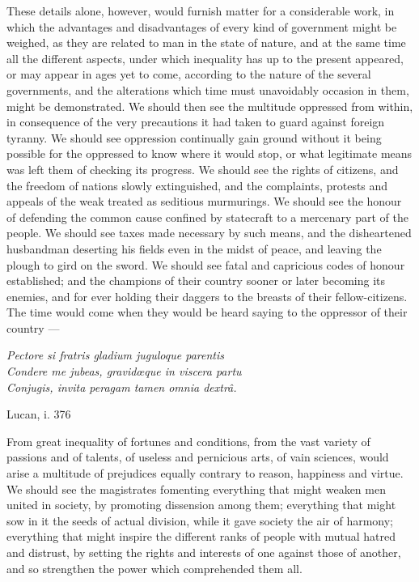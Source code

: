 \documentclass[12pt]{report}
\newcommand{\aquote}[2]{\begin{displayquote} #1 \end{displayquote} \hfill #2}
\begin{document}
These details alone, however, would furnish matter for a considerable work, in which the advantages and disadvantages of every kind of government might be weighed, as they are related to man in the state of nature, and at the same time all the different aspects, under which inequality has up to the present appeared, or may appear in ages yet to come, according to the nature of the several governments, and the alterations which time must unavoidably occasion in them, might be demonstrated. We should then see the multitude oppressed from within, in consequence of the very precautions it had taken to guard against foreign tyranny. We should see oppression continually gain ground without it being possible for the oppressed to know where it would stop, or what legitimate means was left them of checking its progress. We should see the rights of citizens, and the freedom of nations slowly extinguished, and the complaints, protests and appeals of the weak treated as seditious murmurings. We should see the honour of defending the common cause confined by statecraft to a mercenary part of the people. We should see taxes made necessary by such means, and the disheartened husbandman deserting his fields even in the midst of peace, and leaving the plough to gird on the sword. We should see fatal and capricious codes of honour established; and the champions of their country sooner or later becoming its enemies, and for ever holding their daggers to the breasts of their fellow-citizens. The time would come when they would be heard saying to the oppressor of their country —
\aquote{
\textit{Pectore si fratris gladium juguloque parentis \\
Condere me jubeas, gravidœque in viscera partu \\
Conjugis, invita peragam tamen omnia dextr\^{a}.}}
{Lucan, i. 376}

From great inequality of fortunes and conditions, from the vast variety of passions and of talents, of useless and pernicious arts, of vain sciences, would arise a multitude of prejudices equally contrary to reason, happiness and virtue. We should see the magistrates fomenting everything that might weaken men united in society, by promoting dissension among them; everything that might sow in it the seeds of actual division, while it gave society the air of harmony; everything that might inspire the different ranks of people with mutual hatred and distrust, by setting the rights and interests of one against those of another, and so strengthen the power which comprehended them all.
\end{document}
